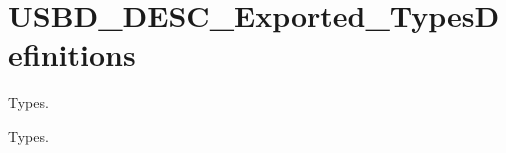 \hypertarget{group__USBD__DESC__Exported__TypesDefinitions}{}\section{U\+S\+B\+D\+\_\+\+D\+E\+S\+C\+\_\+\+Exported\+\_\+\+Types\+Definitions}
\label{group__USBD__DESC__Exported__TypesDefinitions}


Types.  


Types. 

